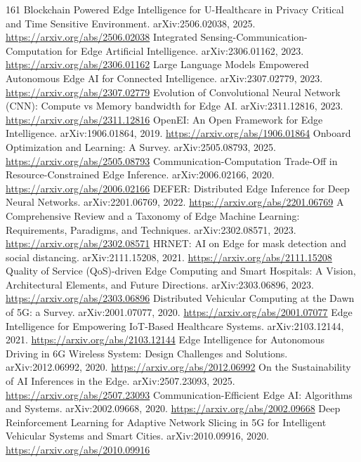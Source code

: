 \documentclass[11pt]{article}
\begin{document}
\begin{thebibliography}{161}
 Blockchain Powered Edge Intelligence for U-Healthcare in Privacy Critical and Time Sensitive Environment. arXiv:2506.02038, 2025. \url{https://arxiv.org/abs/2506.02038}
 Integrated Sensing-Communication-Computation for Edge Artificial Intelligence. arXiv:2306.01162, 2023. \url{https://arxiv.org/abs/2306.01162}
 Large Language Models Empowered Autonomous Edge AI for Connected Intelligence. arXiv:2307.02779, 2023. \url{https://arxiv.org/abs/2307.02779}
 Evolution of Convolutional Neural Network (CNN): Compute vs Memory bandwidth for Edge AI. arXiv:2311.12816, 2023. \url{https://arxiv.org/abs/2311.12816}
 OpenEI: An Open Framework for Edge Intelligence. arXiv:1906.01864, 2019. \url{https://arxiv.org/abs/1906.01864}
 Onboard Optimization and Learning: A Survey. arXiv:2505.08793, 2025. \url{https://arxiv.org/abs/2505.08793}
 Communication-Computation Trade-Off in Resource-Constrained Edge Inference. arXiv:2006.02166, 2020. \url{https://arxiv.org/abs/2006.02166}
 DEFER: Distributed Edge Inference for Deep Neural Networks. arXiv:2201.06769, 2022. \url{https://arxiv.org/abs/2201.06769}
 A Comprehensive Review and a Taxonomy of Edge Machine Learning: Requirements, Paradigms, and Techniques. arXiv:2302.08571, 2023. \url{https://arxiv.org/abs/2302.08571}
 HRNET: AI on Edge for mask detection and social distancing. arXiv:2111.15208, 2021. \url{https://arxiv.org/abs/2111.15208}
 Quality of Service (QoS)-driven Edge Computing and Smart Hospitals: A Vision, Architectural Elements, and Future Directions. arXiv:2303.06896, 2023. \url{https://arxiv.org/abs/2303.06896}
 Distributed Vehicular Computing at the Dawn of 5G: a Survey. arXiv:2001.07077, 2020. \url{https://arxiv.org/abs/2001.07077}
 Edge Intelligence for Empowering IoT-Based Healthcare Systems. arXiv:2103.12144, 2021. \url{https://arxiv.org/abs/2103.12144}
 Edge Intelligence for Autonomous Driving in 6G Wireless System: Design Challenges and Solutions. arXiv:2012.06992, 2020. \url{https://arxiv.org/abs/2012.06992}
 On the Sustainability of AI Inferences in the Edge. arXiv:2507.23093, 2025. \url{https://arxiv.org/abs/2507.23093}
 Communication-Efficient Edge AI: Algorithms and Systems. arXiv:2002.09668, 2020. \url{https://arxiv.org/abs/2002.09668}
 Deep Reinforcement Learning for Adaptive Network Slicing in 5G for Intelligent Vehicular Systems and Smart Cities. arXiv:2010.09916, 2020. \url{https://arxiv.org/abs/2010.09916}

\end{thebibliography}
\end{document}
